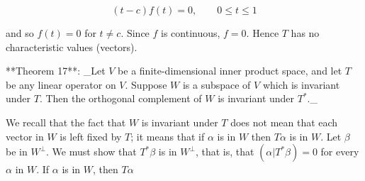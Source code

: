 \[(t-c)f(t)=0,\qquad 0\leq t\leq 1\]

and so \(f(t)=0\) for \(t\neq c\). Since \(f\) is continuous, \(f=0\). Hence \(T\) has no characteristic values (vectors).

**Theorem 17**: _Let \(V\) be a finite-dimensional inner product space, and let \(T\) be any linear operator on \(V\). Suppose \(W\) is a subspace of \(V\) which is invariant under \(T\). Then the orthogonal complement of \(W\) is invariant under \(T^{*}\)._

We recall that the fact that \(W\) is invariant under \(T\) does not mean that each vector in \(W\) is left fixed by \(T\); it means that if \(\alpha\) is in \(W\) then \(T\alpha\) is in \(W\). Let \(\beta\) be in \(W^{\perp}\). We must show that \(T^{*}\beta\) is in \(W^{\perp}\), that is, that \((\alpha|T^{*}\beta)=0\) for every \(\alpha\) in \(W\). If \(\alpha\) is in \(W\), then \(T\alpha\) 